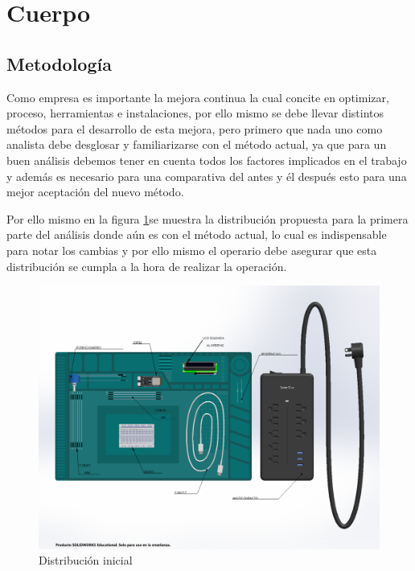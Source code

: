     
    \section{Cuerpo}
    
    \subsection{Metodología}
    
    Como empresa es importante la mejora continua la cual concite en optimizar, proceso, herramientas e instalaciones, por ello mismo se debe llevar distintos métodos para el desarrollo de esta mejora, pero primero que nada uno como analista debe desglosar y familiarizarse con el método actual, ya que para un buen análisis debemos tener en cuenta todos los factores implicados en el trabajo y además es necesario para una comparativa del antes y él después esto para una mejor aceptación del nuevo método.
    
    Por ello mismo en la figura \ref{fig:Distribucion inicial}se muestra la distribución propuesta para la primera parte del análisis donde aún es con el método actual, lo cual es indispensable para notar los cambias y por ello mismo el operario debe asegurar que esta distribución se cumpla a la hora de realizar la operación.
        \begin{figure}[H] 
        \centering
        \includegraphics[trim = {1mm 1mm 1mm 1mm},clip,scale=0.3]{22/Img/ensamblaje.pdf}
        \caption{Distribución inicial}
        \label{fig:Distribucion inicial}
    \end{figure}
    
